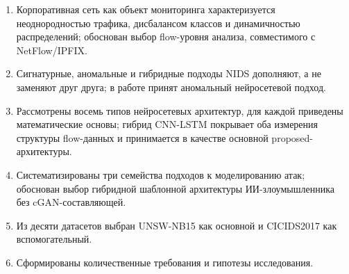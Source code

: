 \begin{enumerate}
    \item Корпоративная сеть как объект мониторинга характеризуется
    неоднородностью трафика, дисбалансом классов и динамичностью
    распределений; обоснован выбор flow-уровня анализа,
    совместимого с NetFlow/IPFIX.
    \item Сигнатурные, аномальные и гибридные подходы NIDS
    дополняют, а не заменяют друг друга; в работе принят аномальный
    нейросетевой подход.
    \item Рассмотрены восемь типов нейросетевых архитектур, для каждой
    приведены математические основы; гибрид CNN-LSTM покрывает оба
    измерения структуры flow-данных и принимается в качестве основной
    proposed-архитектуры.
    \item Систематизированы три семейства подходов к моделированию
    атак; обоснован выбор гибридной шаблонной архитектуры
    ИИ-злоумышленника без cGAN-составляющей.
    \item Из десяти датасетов выбран UNSW-NB15 как основной и
    CICIDS2017 как вспомогательный.
    \item Сформированы количественные требования и гипотезы исследования.
\end{enumerate}
